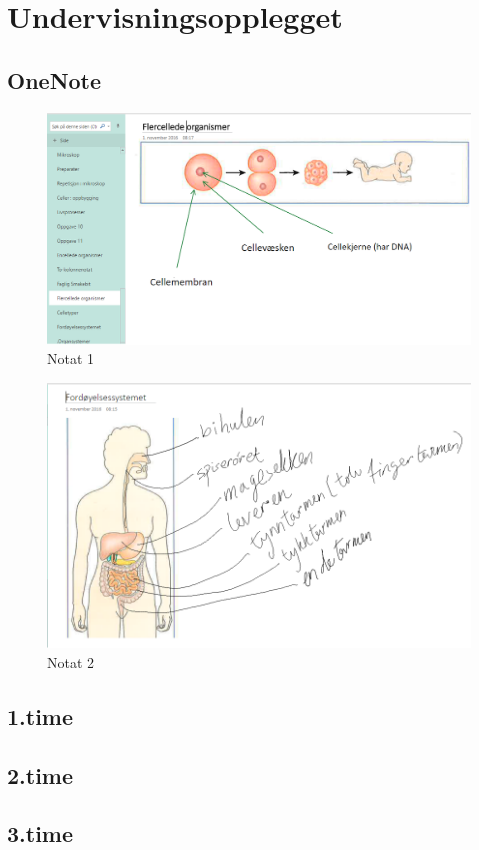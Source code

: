 \documentclass[main.tex]{subfiles}
\begin{document}
\section{Undervisningsopplegget}
\label{sec:1}

\subsection{OneNote}

\begin{figure}[h!]
\includegraphics[scale = 0.6]{../figures/onenote_flercellet.png}
\caption{Notat 1}
\end{figure}

\begin{figure}[h!]
\includegraphics[scale = 0.6]{../figures/onenote_fordoyelse.png}
\caption{Notat 2}
\end{figure}

\subsection{1.time}

\subsection{2.time}

\subsection{3.time}
\end{document}
